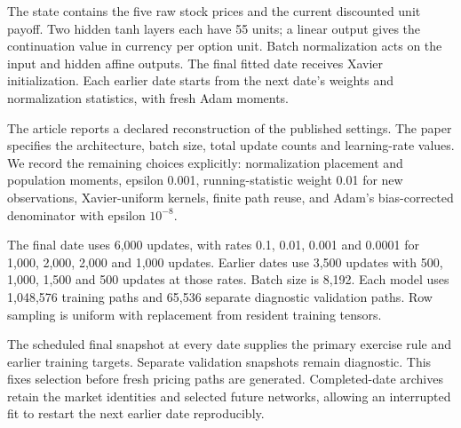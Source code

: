 \documentclass[8pt]{strategynet-journal}
\begin{document}
\begin{SNcolumns}
The state contains the five raw stock prices and the current discounted unit
payoff. Two hidden tanh layers each have 55 units; a linear output gives the
continuation value in currency per option unit. Batch normalization acts on
the input and hidden affine outputs. The final fitted date receives Xavier
initialization. Each earlier date starts from the next date's weights and
normalization statistics, with fresh Adam moments.

The article reports a declared reconstruction of the published settings.
The paper specifies the architecture, batch size, total update counts and
learning-rate values. We record the remaining choices explicitly: normalization
placement and population moments, epsilon 0.001, running-statistic weight
0.01 for new observations, Xavier-uniform kernels, finite path reuse, and
Adam's bias-corrected denominator with epsilon $10^{-8}$.

The final date uses 6,000 updates, with rates 0.1, 0.01, 0.001 and 0.0001 for
1,000, 2,000, 2,000 and 1,000 updates. Earlier dates use 3,500 updates with
500, 1,000, 1,500 and 500 updates at those rates. Batch size is 8,192.
Each model uses 1,048,576 training paths and 65,536 separate diagnostic
validation paths. Row sampling is uniform with replacement from resident
training tensors.

The scheduled final snapshot at every date supplies the primary exercise rule
and earlier training targets. Separate validation snapshots remain diagnostic.
This fixes selection before fresh pricing paths are generated. Completed-date
archives retain the market identities and selected future networks, allowing
an interrupted fit to restart the next earlier date reproducibly.

\begin{center}\begin{minipage}{\linewidth}\centering
{}
\end{minipage}\end{center}


\end{SNcolumns}
\end{document}
